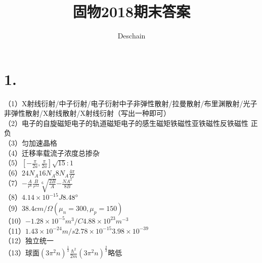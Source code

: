 \documentclass[UTF8]{ctexart}
\title{固物2018期末答案}
\author{Deschain}
\begin{document}
\maketitle
\section*{1.}
（1）X射线衍射/中子衍射/电子衍射中子非弹性散射/拉曼散射/布里渊散射/光子非弹性散射/X射线散射/X射线衍射（写出一种即可）\\
（2）电子的自旋磁矩电子的轨道磁矩电子的感生磁矩铁磁性亚铁磁性反铁磁性
正负\\
（3）匀加速晶格\\
（4）迁移率载流子浓度总掺杂\\
（5）$[-\frac{\pi}{2a},\frac{\pi}{2a}]$$\sqrt{15}:1$\\
（6）$24N_A$$16N_A$$8N_A$$\frac{4\pi}{G}$\\
（7）$-\frac{A}{r^6}$$\frac{B}{r^{12}}$$\sqrt[6]{\frac{2B}{A}}$$-\frac{NA^2}{8B}$\\
（8）$4.14\times10^{-15}J$$8.48\degree$\\
（9）$38.4cm/\Omega(\mu_n=300,\mu_p=150)$\\
（10）$-1.28\times10^{-5}m^3/C$$4.88\times10^{23}m^{-3}$\\
（11）$1.43\times10^{-24}m/s$$2.78\times10^{-15}$$3.98\times10^{-39}$\\
（12）独立统一\\
（13）球面$(3\pi^2n)^{\frac{1}{3}}$$\frac{\hbar^2}{2m}(3\pi^2n)^{\frac{2}{3}}$略低\\
\end{document}
